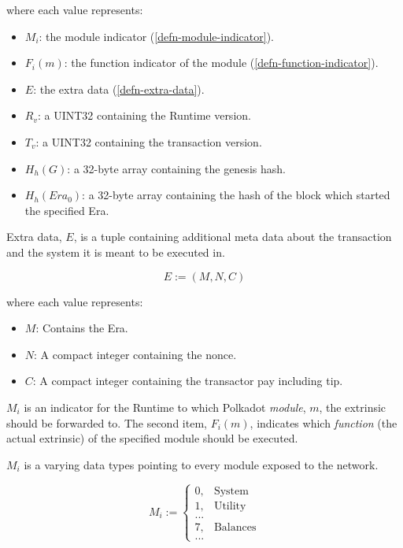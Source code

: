 \begin{definition}
    where each value represents:
    \begin{itemize}
        \item $M_i$: the module indicator (\ref{defn-module-indicator}).
        \item $F_i(m)$: the function indicator of the module (\ref{defn-function-indicator}).
        \item $E$: the extra data (\ref{defn-extra-data}).
        \item $R_v$: a UINT32 containing the Runtime version.
        \item $T_v$: a UINT32 containing the transaction version.
        \item $H_h(G)$: a 32-byte array containing the genesis hash.
        \item $H_h(Era_0)$: a 32-byte array containing the hash of the block which started the specified Era.
    \end{itemize}
\end{definition}

\begin{definition}
    \label{defn-extra-data}
    Extra data, $E$, is a tuple containing additional meta data about the
    transaction and the system it is meant to be executed in. 

    \[
        E := (M, N, C)
    \]

    where each value represents:
    \begin{itemize}
        \item $M$: Contains the Era.
        \item $N$: A compact integer containing the nonce.
        \item $C$: A compact integer containing the transactor pay including tip.
    \end{itemize}

\end{definition}

\begin{definition}
    \label{defn-module-indicator}
    $M_i$ is an indicator for the Runtime to which Polkadot \textit{module},
    $m$, the extrinsic should be forwarded to. The second item, $F_i(m)$,
    indicates which \textit{function} (the actual extrinsic) of the specified
    module should be executed.
    \newline

    $M_i$ is a varying data types pointing to every module exposed to the
    network.

    \[
    M_i :=
    \begin{cases}
    0, & \text{System} \\
    1, & \text{Utility} \\
    ... & \\
    7, & \text{Balances} \\
    ... &
    \end{cases}
    \]
\end{definition}

